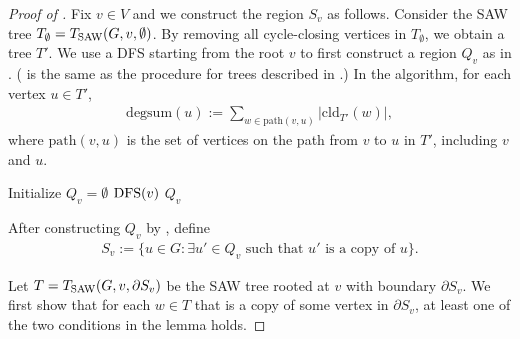 \documentclass[11pt]{amsart}
\def\+#1{\mathcal{#1}}
\newcommand{\defeq}{:=}
\theoremstyle{definition}
\theoremstyle{remark}
\begin{document}
\begin{proof}[Proof of ]
Fix $v \in V$ and we construct the region $S_v$ as follows. Consider the SAW tree $T_\emptyset=T_{\textnormal{SAW}}(G,v,\emptyset)$. By removing all cycle-closing vertices in $T_\emptyset$, we obtain a tree $T'$.
We use a DFS starting from the root $v$ to first construct a region $Q_v$ as in . ( is the same as the procedure for trees described in .) 
In the algorithm, for each vertex $u\in T'$, 
\begin{align*}
  \text{degsum}(u)\defeq\sum_{w\in \text{path}(v,u)}|\text{cld}_{T'}(w)|,
\end{align*}
where $\text{path}(v,u)$ is the set of vertices on the path from $v$ to $u$ in $T'$, including $v$ and $u$.
\begin{algorithm}
    \caption{Construction of the region $Q_v$}\label{alg:Q_v-construction}
    Initialize $Q_v =\emptyset$\;
    $\textnormal{DFS}(v)$\;
    \Return $Q_v$\;
\end{algorithm}  

After constructing $Q_v$ by , define
\begin{align*}
  S_v\defeq\{u\in G:\exists u'\in Q_v \text{ such that } u' \text{ is a copy of } u\}.
\end{align*}

Let $T = T_{\textnormal{SAW}}(G,v,\partial S_v)$ be the SAW tree rooted at $v$ with boundary $\partial S_v$.
We first show that for each $w\in T$ that is a copy of some vertex in $\partial S_v$, at least one of the two conditions in the lemma holds.



\end{proof}
\end{document}
